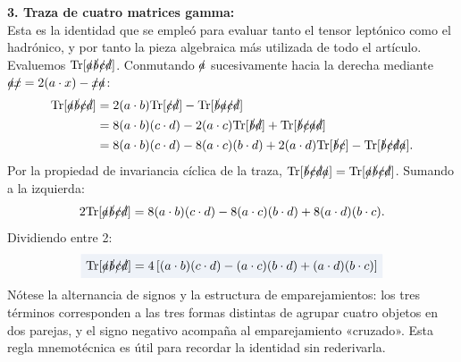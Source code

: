 \documentclass[10pt,a4paper]{article}
\newcommand{\dest}[1]{{\setlength{\fboxsep}{4pt}\colorbox{colordest}{$\displaystyle #1$}}}
\begin{document}
\textbf{3. Traza de cuatro matrices gamma:}\\
Esta es la identidad que se empleó para evaluar tanto el tensor leptónico como el hadrónico, y por tanto la pieza algebraica más utilizada de todo el artículo. Evaluemos $\text{Tr}[\slashed{a}\slashed{b}\slashed{c}\slashed{d}]$. Conmutando $\slashed{a}$ sucesivamente hacia la derecha mediante $\slashed{a}\slashed{x} = 2(a\cdot x) - \slashed{x}\slashed{a}$:
\begin{align}
\text{Tr}[\slashed{a}\slashed{b}\slashed{c}\slashed{d}] &= 2(a\cdot b)\text{Tr}[\slashed{c}\slashed{d}] - \text{Tr}[\slashed{b}\slashed{a}\slashed{c}\slashed{d}] \nonumber \\
&= 8(a\cdot b)(c\cdot d) - 2(a\cdot c)\text{Tr}[\slashed{b}\slashed{d}] + \text{Tr}[\slashed{b}\slashed{c}\slashed{a}\slashed{d}] \nonumber \\
&= 8(a\cdot b)(c\cdot d) - 8(a\cdot c)(b\cdot d) + 2(a\cdot d)\text{Tr}[\slashed{b}\slashed{c}] - \text{Tr}[\slashed{b}\slashed{c}\slashed{d}\slashed{a}].
\end{align}
Por la propiedad de invariancia cíclica de la traza, $\text{Tr}[\slashed{b}\slashed{c}\slashed{d}\slashed{a}] = \text{Tr}[\slashed{a}\slashed{b}\slashed{c}\slashed{d}]$. Sumando a la izquierda:
\begin{equation}
2\text{Tr}[\slashed{a}\slashed{b}\slashed{c}\slashed{d}] = 8(a\cdot b)(c\cdot d) - 8(a\cdot c)(b\cdot d) + 8(a\cdot d)(b\cdot c).
\end{equation}
Dividiendo entre 2:
\begin{equation}
\dest{\text{Tr}[\slashed{a}\slashed{b}\slashed{c}\slashed{d}] = 4 \left[ (a \cdot b)(c \cdot d) - (a \cdot c)(b \cdot d) + (a \cdot d)(b \cdot c) \right]}
\label{eq:trace_4gamma_proved}
\end{equation}
Nótese la alternancia de signos y la estructura de emparejamientos: los tres términos corresponden a las tres formas distintas de agrupar cuatro objetos en dos parejas, y el signo negativo acompaña al emparejamiento «cruzado». Esta regla mnemotécnica es útil para recordar la identidad sin rederivarla.
\end{document}

